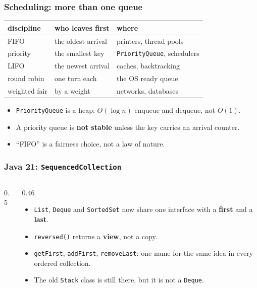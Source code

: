 \documentclass[aspectratio=169,10pt,compress]{beamer}
\begin{document}
\begin{frame}[t,fragile] \frametitle{Scheduling: more than one queue}
  \begin{center}\small
  \begin{tabular}{@{}lll@{}}
    \toprule
    \textbf{discipline} & \textbf{who leaves first} & \textbf{where} \\
    \midrule
    FIFO            & the oldest arrival        & printers, thread pools \\
    priority        & the smallest key          & \texttt{PriorityQueue}, schedulers \\
    LIFO            & the newest arrival        & caches, backtracking \\
    round robin     & one turn each             & the OS ready queue \\
    weighted fair   & by a weight              & networks, databases \\
    \bottomrule
  \end{tabular}
  \end{center}
  \vspace{0.4em}
  \begin{itemize}\small
    \item \texttt{PriorityQueue} is a heap: $O(\log n)$ enqueue and dequeue, not $O(1)$.
    \item A priority queue is \textbf{not stable} unless the key carries an arrival counter.
    \item ``FIFO'' is a fairness choice, not a law of nature.
  \end{itemize}
\end{frame}




\begin{frame}[t,fragile] \frametitle{Java 21: \texttt{SequencedCollection}}
  \begin{columns}[T]
    \begin{column}{0.5\textwidth}
    \end{column}
    \begin{column}{0.46\textwidth}
      \begin{itemize}\small
        \item \texttt{List}, \texttt{Deque} and \texttt{SortedSet} now share one interface with a \textbf{first} and a \textbf{last}.
        \item \texttt{reversed()} returns a \textbf{view}, not a copy.
        \item \texttt{getFirst}, \texttt{addFirst}, \texttt{removeLast}: one name for the same idea in every ordered collection.
        \item The old \texttt{Stack} class is still there, but it is not a \texttt{Deque}.
      \end{itemize}
    \end{column}
  \end{columns}
\end{frame}
\end{document}
